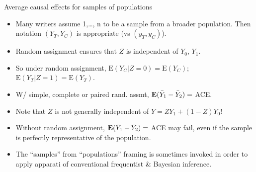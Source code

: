 \begin{frame}{Average causal effects for samples of populations}
  
  \begin{itemize}
  \item Many writers assume 1,\ldots, n to be a sample from a
  broader population. Then notation $(Y_{T}, Y_{C})$ is appropriate
  (vs $(y_{T}, y_{C})$). 
  \item Random assignment ensures that $Z$ is independent of $Y_0$, $Y_1$.
  \item So under random assignment, $\mathrm{E}(Y_C|Z=0) =
  \mathrm{E}(Y_C)$;  $\mathrm{E}(Y_T|Z=1) = \mathrm{E}(Y_T)$.
  \item W/ simple, complete or paired rand. assmt, $\mathbf{E}( \bar{Y}_{1}
  - \bar{Y}_{2}) = $ ACE. 
  \item Note that $Z$ is not generally independent of $Y=ZY_1 +
  (1-Z)Y_0$!
  \item Without random assignment, $\mathbf{E}( \bar{Y}_{1}
  - \bar{Y}_{2}) = $ ACE may fail, even if the sample is perfectly
  representative of the population.
\item The ``samples'' from
  ``populations'' framing is sometimes invoked in order to apply apparati of conventional
  frequentist \& Bayesian inference.
  \end{itemize}
\end{frame}




